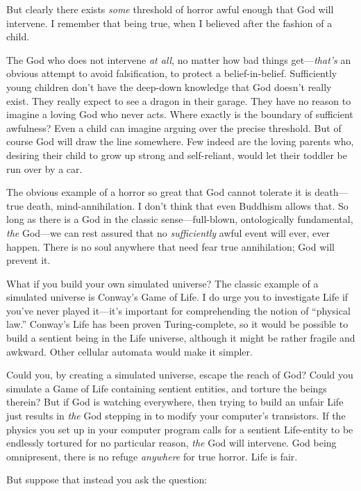 {
 But clearly there exists \textit{some} threshold of horror awful
enough that God will intervene. I remember that being true, when I
believed after the fashion of a child.}

{
 The God who does not intervene \textit{at all}, no matter how bad
things get---\textit{that's} an obvious attempt to
avoid falsification, to protect a belief-in-belief. Sufficiently young
children don't have the deep-down knowledge that God
doesn't really exist. They really expect to see a
dragon in their garage. They have no reason to imagine a loving God who
never acts. Where exactly is the boundary of sufficient awfulness? Even
a child can imagine arguing over the precise threshold. But of course
God will draw the line somewhere. Few indeed are the loving parents
who, desiring their child to grow up strong and self-reliant, would let
their toddler be run over by a car.}

{
 The obvious example of a horror so great that God cannot tolerate
it is death---true death, mind-annihilation. I don't
think that even Buddhism allows that. So long as there is a God in the
classic sense---full-blown, ontologically fundamental, \textit{the}
God---we can rest assured that no \textit{sufficiently} awful event
will ever, ever happen. There is no soul anywhere that need fear true
annihilation; God will prevent it.}

{
 What if you build your own simulated universe? The classic example
of a simulated universe is Conway's Game of Life. I do
urge you to investigate Life if you've never played
it---it's important for comprehending the notion of
``physical law.''
Conway's Life has been proven Turing-complete, so it
would be possible to build a sentient being in the Life universe,
although it might be rather fragile and awkward. Other cellular
automata would make it simpler.}

{
 Could you, by creating a simulated universe, escape the reach of
God? Could you simulate a Game of Life containing sentient entities,
and torture the beings therein? But if God is watching everywhere, then
trying to build an unfair Life just results in \textit{the} God
stepping in to modify your computer's transistors. If
the physics you set up in your computer program calls for a sentient
Life-entity to be endlessly tortured for no particular reason,
\textit{the} God will intervene. God being omnipresent, there is no
refuge \textit{anywhere} for true horror. Life is fair.}

{
 But suppose that instead you ask the question:}

